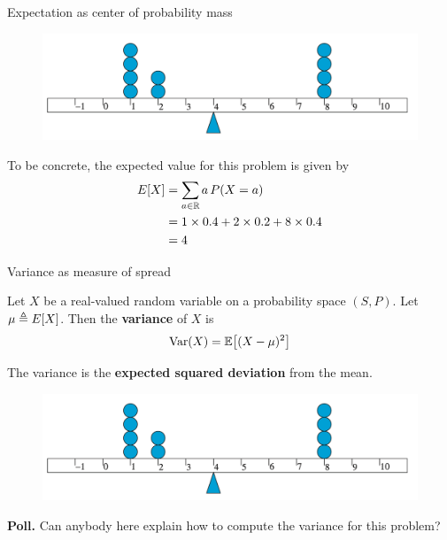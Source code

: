 \documentclass[10pt]{beamer}
\begin{document}
\begin{frame}{Expectation as center of probability mass}

\begin{figure}
\includegraphics[width=.7\textwidth]{images/center_of_mass}
\end{figure}
\vfill 

To be concrete, the expected value for this problem is given by 
%
\begin{align*}
E[X] &= \sum_{a \in \mathbb{R}} a \, P(X=a) \\
&= 1 \times 0.4 + 2 \times 0.2 + 8 \times 0.4 \\
&= 4 
\end{align*}


\end{frame}


\begin{frame}{Variance as measure of spread}
\footnotesize 
\begin{mygreenbox}[title=Definition]
Let $X$ be a real-valued random variable on a probability space $(S,P)$. Let $\mu \triangleq E[X]$.  Then the \textbf{variance} of $X$ is
\[ \text{Var}(X) = \mathbb{E} \big[ (X - \mu)^2 \big] \]
\end{mygreenbox}

\vfill 

\begin{myredbox}[title=Remark]
The variance is the \textbf{expected squared deviation} from the mean. 
\end{myredbox}
\vfill 
\begin{figure}
\includegraphics[width=.7\textwidth]{images/center_of_mass}
\end{figure}

\pause 
\vfill 
\colorbox{yellow!30}{\textbf{Poll.}} Can anybody here explain how to compute the variance for this problem? 
\end{frame}
\end{document}
